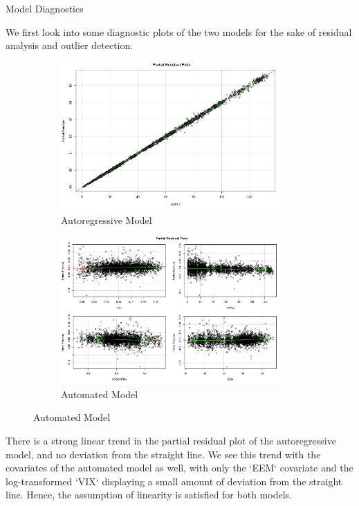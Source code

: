 \documentclass[]{article}
\begin{document}
\begin{section}{Model Diagnostics}

We first look into some diagnostic plots of the two models for the sake of residual analysis and outlier detection.

\begin{figure}[h]
\begin{subfigure}{.5\textwidth}
  \includegraphics[width=85mm]{diagnostics/arm_covar_residuals.png}
  \caption{Autoregressive Model}
\end{subfigure}%
\begin{subfigure}{.5\textwidth}
  \includegraphics[width=85mm]{diagnostics/fm_covar_residuals.png}
  \caption{Automated Model}
\end{subfigure}
\end{figure}

There is a strong linear trend in the partial residual plot of the autoregressive model, and no deviation from the straight line. We see this trend with the covariates of the automated model as well, with only the `EEM` covariate and the log-transformed `VIX` displaying a small amount of deviation from the straight line. Hence, the assumption of linearity is satisfied for both models.


\end{section}
\end{document}
